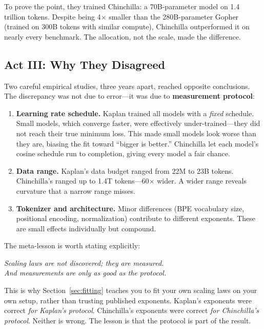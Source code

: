 To prove the point, they trained Chinchilla: a 70B-parameter model on 1.4 trillion tokens. Despite being 4$\times$ smaller than the 280B-parameter Gopher (trained on 300B tokens with similar compute), Chinchilla outperformed it on nearly every benchmark. The allocation, not the scale, made the difference.


\subsection{Act III: Why They Disagreed}
\label{sec:disagreement}

Two careful empirical studies, three years apart, reached opposite conclusions. The discrepancy was not due to error---it was due to \textbf{measurement protocol}:

\begin{enumerate}[nosep]
  \item \textbf{Learning rate schedule.} Kaplan trained all models with a \emph{fixed} schedule. Small models, which converge faster, were effectively under-trained---they did not reach their true minimum loss. This made small models look worse than they are, biasing the fit toward ``bigger is better.'' Chinchilla let each model's cosine schedule run to completion, giving every model a fair chance.
  \item \textbf{Data range.} Kaplan's data budget ranged from 22M to 23B tokens. Chinchilla's ranged up to 1.4T tokens---60$\times$ wider. A wider range reveals curvature that a narrow range misses.
  \item \textbf{Tokenizer and architecture.} Minor differences (BPE vocabulary size, positional encoding, normalization) contribute to different exponents. These are small effects individually but compound.
\end{enumerate}

The meta-lesson is worth stating explicitly:

\begin{tcolorbox}[colback=orange!5, colframe=orange!60, title={}]
\centering\itshape
Scaling laws are not discovered; they are measured.\\
And measurements are only as good as the protocol.
\end{tcolorbox}

This is why Section~\ref{sec:fitting} teaches you to fit your own scaling laws on your own setup, rather than trusting published exponents. Kaplan's exponents were correct \emph{for Kaplan's protocol}. Chinchilla's exponents were correct \emph{for Chinchilla's protocol}. Neither is wrong. The lesson is that the protocol is part of the result.



